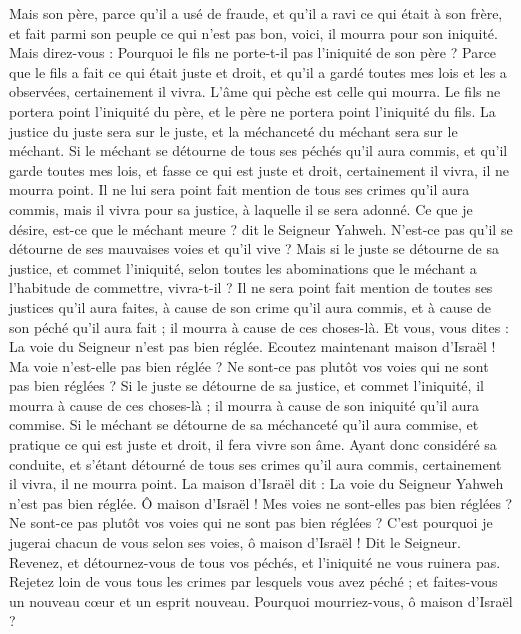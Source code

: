\begin{multicols}{2}
Mais son père, parce qu'il a usé de fraude, et qu'il a ravi ce qui était à son frère, et fait parmi son peuple ce qui n'est pas bon, voici, il mourra pour son iniquité.
Mais direz-vous : Pourquoi le fils ne porte-t-il pas l'iniquité de son père ? Parce que le fils a fait ce qui était juste et droit, et qu'il a gardé toutes mes lois et les a observées, certainement il vivra.
L'âme qui pèche est celle qui mourra. Le fils ne portera point l'iniquité du père, et le père ne portera point l'iniquité du fils. La justice du juste sera sur le juste, et la méchanceté du méchant sera sur le méchant.
Si le méchant se détourne de tous ses péchés qu'il aura commis, et qu'il garde toutes mes lois, et fasse ce qui est juste et droit, certainement il vivra, il ne mourra point.
Il ne lui sera point fait mention de tous ses crimes qu'il aura commis, mais il vivra pour sa justice, à laquelle il se sera adonné.
Ce que je désire, est-ce que le méchant meure ? dit le Seigneur Yahweh. N'est-ce pas qu'il se détourne de ses mauvaises voies et qu'il vive ?
Mais si le juste se détourne de sa justice, et commet l'iniquité, selon toutes les abominations que le méchant a l'habitude de commettre, vivra-t-il ? Il ne sera point fait mention de toutes ses justices qu'il aura faites, à cause de son crime qu'il aura commis, et à cause de son péché qu'il aura fait ; il mourra à cause de ces choses-là.
Et vous, vous dites : La voie du Seigneur n'est pas bien réglée. Ecoutez maintenant maison d'Israël ! Ma voie n'est-elle pas bien réglée ? Ne sont-ce pas plutôt vos voies qui ne sont pas bien réglées ?
Si le juste se détourne de sa justice, et commet l'iniquité, il mourra à cause de ces choses-là ; il mourra à cause de son iniquité qu'il aura commise.
Si le méchant se détourne de sa méchanceté qu'il aura commise, et pratique ce qui est juste et droit, il fera vivre son âme.
Ayant donc considéré sa conduite, et s'étant détourné de tous ses crimes qu'il aura commis, certainement il vivra, il ne mourra point.
La maison d'Israël dit : La voie du Seigneur Yahweh n'est pas bien réglée. Ô maison d'Israël ! Mes voies ne sont-elles pas bien réglées ? Ne sont-ce pas plutôt vos voies qui ne sont pas bien réglées ?
C'est pourquoi je jugerai chacun de vous selon ses voies, ô maison d'Israël ! Dit le Seigneur. Revenez, et détournez-vous de tous vos péchés, et l'iniquité ne vous ruinera pas.
Rejetez loin de vous tous les crimes par lesquels vous avez péché ; et faites-vous un nouveau cœur et un esprit nouveau. Pourquoi mourriez-vous, ô maison d'Israël ?

\end{multicols}
